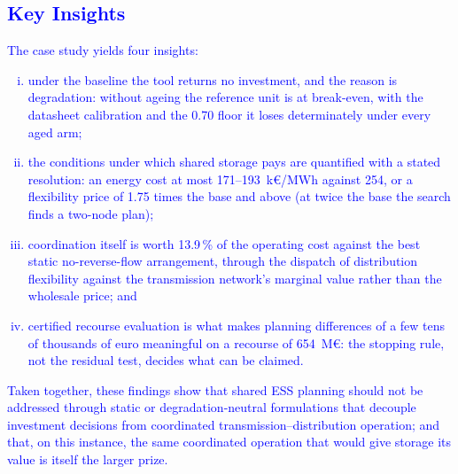 \subsection{\textcolor{blue}{Key Insights}}
\label{subsec:res_insights}

\textcolor{blue}{
    The case study yields four insights:
    \begin{enumerate}[(i)]
        \item under the baseline the tool returns no investment, and the reason is degradation: without ageing the reference unit is at break-even, with the datasheet calibration and the 0.70 floor it loses determinately under every aged arm;
        \item the conditions under which shared storage pays are quantified with a stated resolution: an energy cost at most 171--193~k\euro/MWh against 254, or a flexibility price of 1.75 times the base and above (at twice the base the search finds a two-node plan);
        \item coordination itself is worth 13.9\,\% of the operating cost against the best static no-reverse-flow arrangement, through the dispatch of distribution flexibility against the transmission network's marginal value rather than the wholesale price; and
        \item certified recourse evaluation is what makes planning differences of a few tens of thousands of euro meaningful on a recourse of 654~M\euro: the stopping rule, not the residual test, decides what can be claimed.
    \end{enumerate}
}

\textcolor{blue}{Taken together, these findings show that shared ESS planning should not be addressed through static or degradation-neutral formulations that decouple investment decisions from coordinated transmission--distribution operation; and that, on this instance, the same coordinated operation that would give storage its value is itself the larger prize.}

